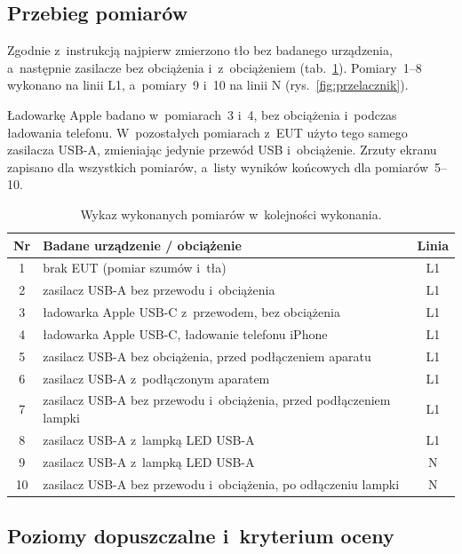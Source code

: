 \documentclass[11pt,a4paper]{article}
\begin{document}
\FloatBarrier
\subsection{Przebieg pomiarów}

Zgodnie z~instrukcją najpierw zmierzono tło bez badanego urządzenia, a~następnie zasilacze
bez obciążenia i~z~obciążeniem (tab.~\ref{tab:pomiary}). Pomiary~1--8 wykonano na linii L1,
a~pomiary~9 i~10 na linii N (rys.~\ref{fig:przelacznik}).

Ładowarkę Apple badano w~pomiarach~3 i~4, bez obciążenia i~podczas ładowania telefonu.
W~pozostałych pomiarach z~EUT użyto tego samego zasilacza USB-A, zmieniając jedynie przewód USB
i~obciążenie. Zrzuty
ekranu zapisano dla wszystkich pomiarów, a~listy wyników końcowych dla pomiarów~5--10.

\begin{table}[H]
  \centering
  \small
  \caption{Wykaz wykonanych pomiarów w~kolejności wykonania.}
  \label{tab:pomiary}
  \renewcommand{\arraystretch}{1.2}
  \begin{tabular}{|c|>{\raggedright\arraybackslash}p{8cm}|c|}
    \hline
    \textbf{Nr} & \textbf{Badane urządzenie / obciążenie} & \textbf{Linia} \\
    \hline
    1  & brak EUT (pomiar szumów i~tła) & L1 \\ \hline
    2  & zasilacz USB-A bez przewodu i~obciążenia & L1 \\ \hline
    3  & ładowarka Apple USB-C z~przewodem, bez obciążenia & L1 \\ \hline
    4  & ładowarka Apple USB-C, ładowanie telefonu iPhone & L1 \\ \hline
    5  & zasilacz USB-A bez obciążenia, przed podłączeniem aparatu & L1 \\ \hline
    6  & zasilacz USB-A z~podłączonym aparatem & L1 \\ \hline
    7  & zasilacz USB-A bez przewodu i~obciążenia, przed podłączeniem lampki & L1 \\ \hline
    8  & zasilacz USB-A z~lampką LED USB-A & L1 \\ \hline
    9  & zasilacz USB-A z~lampką LED USB-A & N  \\ \hline
    10 & zasilacz USB-A bez przewodu i~obciążenia, po odłączeniu lampki & N  \\ \hline
  \end{tabular}
\end{table}

\subsection{Poziomy dopuszczalne i~kryterium oceny}
\end{document}
